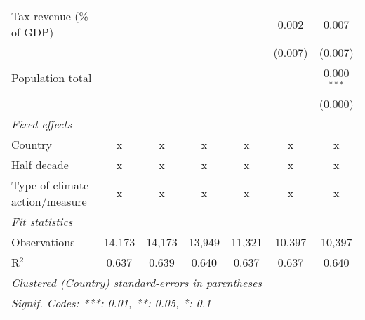 \begin{tabular}{lcccccc}
   Tax revenue (\% of GDP)              &              &               &                &               & 0.002         & 0.007\\   
                                        &              &               &                &               & (0.007)       & (0.007)\\   
   Population total                     &              &               &                &               &               & 0.000$^{***}$\\   
                                        &              &               &                &               &               & (0.000)\\   
   \emph{Fixed effects}\\
   Country                              & x            & x             & x              & x             & x             & x\\  
   Half decade                          & x            & x             & x              & x             & x             & x\\  
   Type of climate action/measure       & x            & x             & x              & x             & x             & x\\  
   \midrule \emph{Fit statistics}\\
   Observations                         & 14,173       & 14,173        & 13,949         & 11,321        & 10,397        & 10,397\\  
   R$^2$                                & 0.637        & 0.639         & 0.640          & 0.637         & 0.637         & 0.640\\  
   \midrule
   \multicolumn{7}{l}{\emph{Clustered (Country) standard-errors in parentheses}}\\
   \multicolumn{7}{l}{\emph{Signif. Codes: ***: 0.01, **: 0.05, *: 0.1}}\\
\end{tabular}
\par\endgroup



